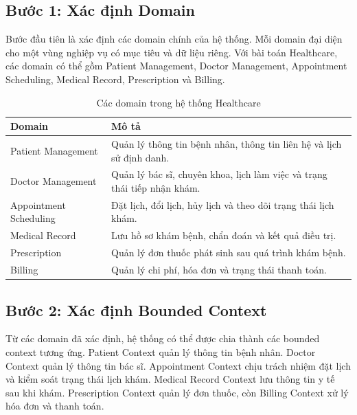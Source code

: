 \documentclass[../main.tex]{subfiles}
\begin{document}
\subsection{Bước 1: Xác định Domain}

Bước đầu tiên là xác định các domain chính của hệ thống. Mỗi domain đại diện cho một vùng nghiệp vụ có mục tiêu và dữ liệu riêng. Với bài toán Healthcare, các domain có thể gồm Patient Management, Doctor Management, Appointment Scheduling, Medical Record, Prescription và Billing.

\begin{table}[H]
    \centering
    \caption{Các domain trong hệ thống Healthcare}
    \label{tab:chapter1_healthcare_domains}
    \begin{tabular}{|p{}|p{}|}
        \hline
        \rowcolor{primary!35}
        \textbf{Domain} & \textbf{Mô tả} \\
        \hline
        Patient Management & Quản lý thông tin bệnh nhân, thông tin liên hệ và lịch sử định danh. \\
        \hline
        Doctor Management & Quản lý bác sĩ, chuyên khoa, lịch làm việc và trạng thái tiếp nhận khám. \\
        \hline
        Appointment Scheduling & Đặt lịch, đổi lịch, hủy lịch và theo dõi trạng thái lịch khám. \\
        \hline
        Medical Record & Lưu hồ sơ khám bệnh, chẩn đoán và kết quả điều trị. \\
        \hline
        Prescription & Quản lý đơn thuốc phát sinh sau quá trình khám bệnh. \\
        \hline
        Billing & Quản lý chi phí, hóa đơn và trạng thái thanh toán. \\
        \hline
    \end{tabular}
\end{table}

\subsection{Bước 2: Xác định Bounded Context}

Từ các domain đã xác định, hệ thống có thể được chia thành các bounded context tương ứng. Patient Context quản lý thông tin bệnh nhân. Doctor Context quản lý thông tin bác sĩ. Appointment Context chịu trách nhiệm đặt lịch và kiểm soát trạng thái lịch khám. Medical Record Context lưu thông tin y tế sau khi khám. Prescription Context quản lý đơn thuốc, còn Billing Context xử lý hóa đơn và thanh toán.
\end{document}
